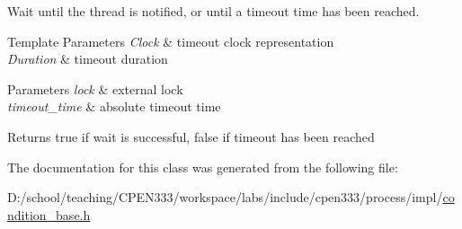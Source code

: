 Wait until the thread is notified, or until a timeout time has been reached. 


\begin{DoxyTemplParams}{Template Parameters}
{\em Clock} & timeout clock representation \\
\hline
{\em Duration} & timeout duration \\
\hline
\end{DoxyTemplParams}

\begin{DoxyParams}{Parameters}
{\em lock} & external lock \\
\hline
{\em timeout\+\_\+time} & absolute timeout time \\
\hline
\end{DoxyParams}
\begin{DoxyReturn}{Returns}
true if wait is successful, false if timeout has been reached 
\end{DoxyReturn}


The documentation for this class was generated from the following file\+:\begin{DoxyCompactItemize}
\item 
D\+:/school/teaching/\+C\+P\+E\+N333/workspace/labs/include/cpen333/process/impl/\hyperlink{condition__base_8h}{condition\+\_\+base.\+h}\end{DoxyCompactItemize}
